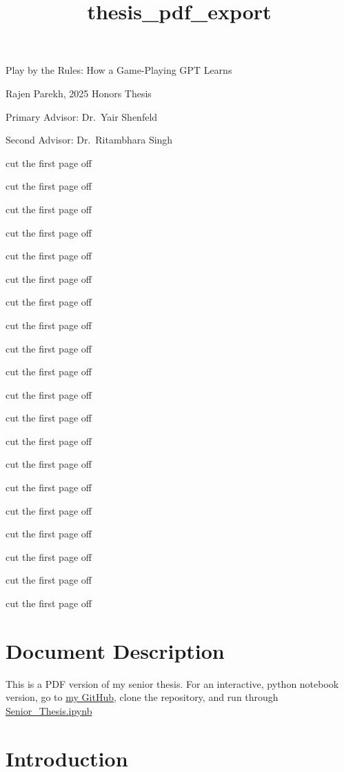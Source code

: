 \documentclass[11pt]{article}
\title{thesis\_pdf\_export}
\begin{document}
    
    \maketitle
    
    

    
    Play by the Rules: How a Game-Playing GPT Learns

Rajen Parekh, 2025 Honors Thesis

Primary Advisor: Dr.~Yair Shenfeld

Second Advisor: Dr.~Ritambhara Singh

    cut the first page off

cut the first page off

cut the first page off

cut the first page off

cut the first page off

cut the first page off

cut the first page off

cut the first page off

cut the first page off

cut the first page off

cut the first page off

cut the first page off

cut the first page off

cut the first page off

cut the first page off

cut the first page off

cut the first page off

cut the first page off

cut the first page off

cut the first page off

    \section{Document Description}\label{document-description}

This is a PDF version of my senior thesis. For an interactive, python
notebook version, go to
\href{https://github.com/rajennparekh/game-thesis}{my GitHub}, clone the
repository, and run through
\href{https://github.com/rajennparekh/game-thesis/blob/main/mnk_transformer/Senior_Thesis.ipynb}{Senior\_Thesis.ipynb}

    \section{Introduction}\label{introduction}
\end{document}
